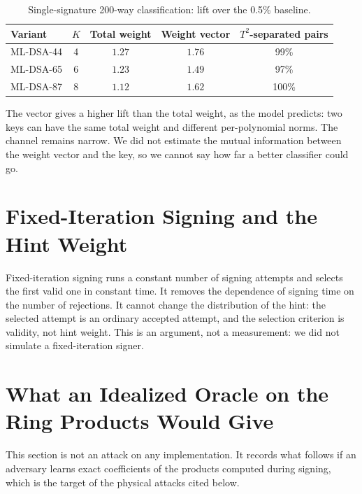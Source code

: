 \documentclass{article}
\begin{document}
\begin{table}[h!]
\centering
\caption{Single-signature 200-way classification: lift over the 0.5\%
baseline.}
\label{tab:multivarlift}
\begin{tabular}{lcccc}
\toprule
\textbf{Variant} & $K$ & \textbf{Total weight} & \textbf{Weight vector} &
\textbf{$T^2$-separated pairs} \\
\midrule
ML-DSA-44 & 4 & $1.27$ & $1.76$ & 99\% \\
ML-DSA-65 & 6 & $1.23$ & $1.49$ & 97\% \\
ML-DSA-87 & 8 & $1.12$ & $1.62$ & 100\% \\
\bottomrule
\end{tabular}
\end{table}

The vector gives a higher lift than the total weight, as the model predicts: two keys can have
the same total weight and different per-polynomial norms.  The channel remains
narrow.  We did not estimate the mutual information between the weight vector
and the key, so we cannot say how far a better classifier could go.

\section{Fixed-Iteration Signing and the Hint Weight}
\label{sec:fis}

Fixed-iteration signing runs a constant number of signing attempts and selects
the first valid one in constant time.  It removes the dependence of signing
time on the number of rejections.  It cannot change the distribution of the
hint: the selected attempt is an ordinary accepted attempt, and the selection
criterion is validity, not hint weight.  This is an argument, not a
measurement: we did not simulate a fixed-iteration signer.

\section{What an Idealized Oracle on the Ring Products Would Give}
\label{sec:oracle}

This section is not an attack on any implementation.  It records what follows
if an adversary learns exact coefficients of the products computed during
signing, which is the target of the physical attacks cited below.
\end{document}
